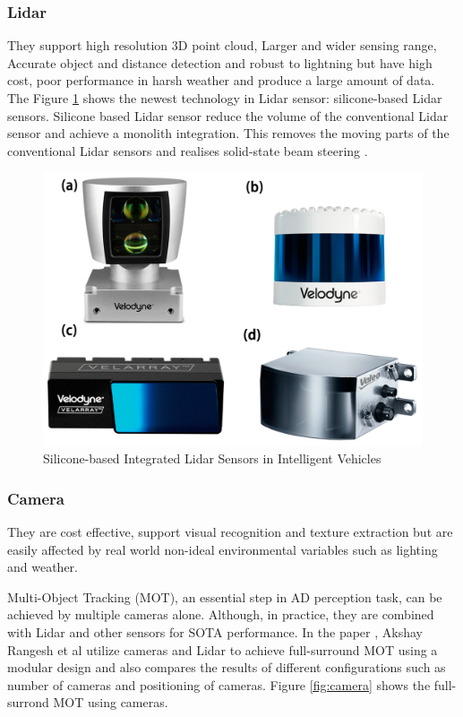 \begin{spacing}{1.5}
\begin{sloppypar}
\subsubsection{Lidar}
They support high resolution 3D point cloud, Larger and wider sensing range, Accurate object and distance detection and robust to lightning but have high cost, poor performance in harsh weather and produce a large amount of data. The Figure \ref{fig:lidar} shows the newest technology in Lidar sensor: silicone-based Lidar sensors. Silicone based Lidar sensor reduce the volume of the conventional Lidar sensor and achieve a monolith integration. This removes the moving parts of the conventional Lidar sensors and realises solid-state beam steering \cite{hu2023advances}. 

\begin{figure}[h]
\begin{center}
\includegraphics[scale=0.1]{2/lidar_Sensor.png}
\caption{Silicone-based Integrated Lidar Sensors in Intelligent Vehicles}
\label{fig:lidar}
\end{center}
\end{figure}

\subsubsection{Camera}
They are cost effective, support visual recognition and texture extraction but are easily affected by real world non-ideal environmental variables such as lighting and weather.

Multi-Object Tracking (MOT), an essential step in AD perception task, can be achieved by multiple cameras alone. Although, in practice, they are combined with Lidar and other sensors for SOTA performance. In the paper \cite{pereira2016self}, Akshay Rangesh et al utilize cameras and Lidar to achieve full-surround MOT using a modular design and also compares the results of different configurations such as number of cameras and positioning of cameras. Figure \ref{fig:camera} shows the full-surrond MOT using cameras. 


\end{sloppypar}
\end{spacing}
